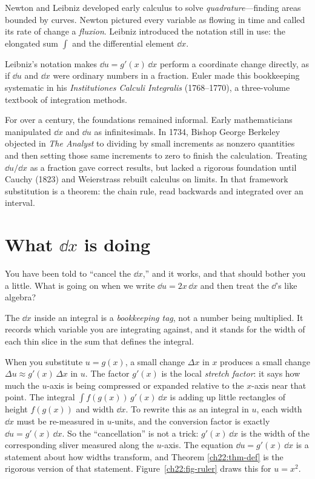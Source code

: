 \begin{historybox}
Newton and Leibniz developed early calculus to solve \emph{quadrature}---finding
areas bounded by curves. Newton pictured every variable as flowing in time and
called its rate of change a \emph{fluxion}. Leibniz introduced the notation still in
use: the elongated sum $\int$ and the differential element $\dd x$.

Leibniz's notation makes $\dd u = g'(x)\,\dd x$ perform a coordinate change
directly, as if $\dd u$ and $\dd x$ were ordinary numbers in a fraction. Euler made
this bookkeeping systematic in his \emph{Institutiones Calculi Integralis}
(1768--1770), a three-volume textbook of integration methods.

For over a century, the foundations remained informal. Early mathematicians
manipulated $\dd x$ and $\dd u$ as infinitesimals. In 1734, Bishop George Berkeley
objected in \emph{The Analyst} to dividing by small increments as nonzero quantities
and then setting those same increments to zero to finish the calculation.
Treating $\dd u / \dd x$ as a fraction gave correct results, but lacked a rigorous
foundation until Cauchy (1823) and Weierstrass rebuilt calculus on limits. In that
framework substitution is a theorem: the chain rule, read backwards and integrated
over an interval.
\end{historybox}

\section{What $\dd x$ is doing}
\label{ch22:what-dx-does}

You have been told to ``cancel the $\dd x$,'' and it works, and that should bother
you a little. What is going on when we write $\dd u = 2x\,\dd x$ and then
treat the $\dd$'s like algebra?

\begin{happeningbox}
The $\dd x$ inside an integral is a \emph{bookkeeping tag}, not a number being
multiplied. It records which variable you are integrating against, and it stands
for the width of each thin slice in the sum that defines the integral.

When you substitute $u = g(x)$, a small change $\Delta x$ in $x$ produces a small
change $\Delta u \approx g'(x)\,\Delta x$ in $u$. The factor $g'(x)$ is the local
\emph{stretch factor}: it says how much the $u$-axis is being compressed or
expanded relative to the $x$-axis near that point. The integral
$\int f(g(x))\,g'(x)\,\dd x$ is adding up little rectangles of height $f(g(x))$ and
width $\dd x$. To rewrite this as an integral in $u$, each width $\dd x$ must be
re-measured in $u$-units, and the conversion factor is exactly $\dd u = g'(x)\,\dd
x$. So the ``cancellation'' is not a trick: $g'(x)\,\dd x$ is the
width of the corresponding sliver measured along the $u$-axis. The equation
$\dd u = g'(x)\,\dd x$ is a statement about how widths transform, and Theorem
\ref{ch22:thm-def} is the rigorous version of that statement.
Figure~\ref{ch22:fig-ruler} draws this for $u = x^2$.
\end{happeningbox}


